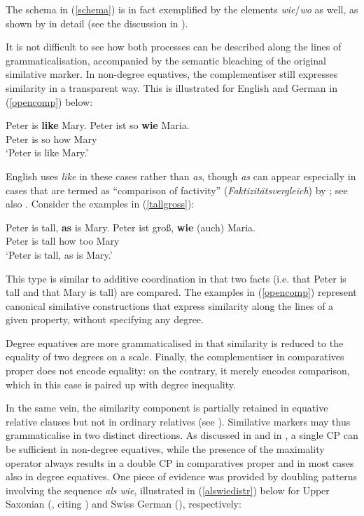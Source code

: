The schema in (\ref{schema}) is in fact exemplified by the elements \textit{wie}/\textit{wo} as well, as shown by \citet{brandnerbraeuning2013} in detail (see the discussion in ).

It is not difficult to see how both processes can be described along the lines of grammaticalisation, accompanied by the semantic bleaching of the original similative marker. In non-degree equatives, the complementiser still expresses similarity in a transparent way. This is illustrated for English and German in (\ref{opencomp}) below:

\ea \label{opencomp}
\ea Peter is \textbf{like} Mary.
\ex \gll Peter ist so \textbf{wie} Maria.\\
Peter is so how Mary\\
\glt `Peter is like Mary.'
\z
\z

English uses \textit{like} in these cases rather than \textit{as}, though \textit{as} can appear especially in cases that are termed as ``comparison of factivity'' (\textit{Faktizitätsvergleich}) by \citet{jaeger2010}; see also \citet[165--182]{thurmair2001}. Consider the examples in (\ref{tallgross}):

\ea \label{tallgross}
\ea Peter is tall, \textbf{as} is Mary.
\ex \gll Peter ist groß, \textbf{wie} (auch) Maria.\\
Peter is tall how \phantom{[}too Mary\\
\glt `Peter is tall, as is Mary.'
\z
\z

This type is similar to additive coordination in that two facts (i.e. that Peter is tall and that Mary is tall) are compared. The examples in (\ref{opencomp}) represent canonical similative constructions that express similarity along the lines of a given property, without specifying any degree.

Degree equatives are more grammaticalised in that similarity is reduced to the equality of two degrees on a scale. Finally, the complementiser in comparatives proper does not encode equality: on the contrary, it merely encodes comparison, which in this case is paired up with degree inequality.

In the same vein, the similarity component is partially retained in equative relative clauses but not in ordinary relatives (see ). Similative markers may thus grammaticalise in two distinct directions. As discussed in  and in , a single CP can be sufficient in non-degree equatives, while the presence of the maximality operator always results in a double CP in comparatives proper and in most cases also in degree equatives. One piece of evidence was provided by doubling patterns involving the sequence \textit{als wie}, illustrated in (\ref{alswiedistr}) below for Upper Saxonian (\citealt[292, ex. 494b]{jaeger2018}, citing \citealt[174]{weise1918}) and Swiss German (\citealt[659]{friedli2012diss}), respectively:

